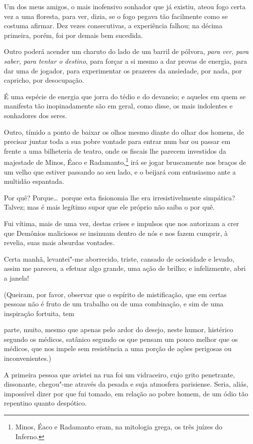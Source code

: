 Um dos meus amigos, o mais inofensivo sonhador que já existiu, ateou
fogo certa vez a uma floresta, para ver, dizia, se o fogo pegava tão facilmente como se costuma afirmar. Dez vezes consecutivas, a
experiência falhou; na décima primeira, porém, foi por demais bem
sucedida.

Outro poderá acender um charuto do lado de um barril de pólvora, \textit{para ver,
para saber, para tentar o destino}, para forçar a si mesmo a dar
provas de energia, para dar uma de jogador, para experimentar os prazeres da %
ansiedade, por nada, por capricho, por desocupação. 

É uma espécie de energia que jorra do tédio e do devaneio; e aqueles em quem se manifesta tão inopinadamente são em geral, como 
disse, os mais indolentes e sonhadores dos seres.

Outro, tímido a ponto de baixar os olhos mesmo diante do olhar dos
homens, de precisar juntar toda a sua pobre vontade
para entrar num bar ou passar em frente a uma bilheteria de teatro, onde
os fiscais lhe parecem investidos da majestade de Minos, Éaco e
Radamanto,\protect\footnote{  Minos, Éaco e Radamanto eram, na mitologia grega, os três juízes do
Inferno.} irá se jogar bruscamente nos braços de um
velho que estiver passando ao seu lado, e o beijará com entusiasmo
ante a multidão espantada.

Por quê? Porque\ldots\  porque esta fisionomia lhe era irresistivelmente
simpática? Talvez; mas é mais legítimo supor que ele próprio não saiba o
por quê.

Fui vítima, mais de uma vez, destas crises e impulsos que nos
autorizam a crer que Demônios maliciosos se insinuam dentro de nós e
nos fazem cumprir, à revelia, suas mais absurdas vontades.

Certa manhã, levantei"-me aborrecido, triste, cansado de ociosidade e
levado, assim me pareceu, a efetuar algo grande, uma ação de brilho; e infelizmente, abri a
janela!

(Queiram, por favor, observar que o espírito de mistificação, que em
certas pessoas não é fruto de um trabalho ou de uma combinação, e sim 
de uma inspiração fortuita, tem


\noindent{}parte, muito, mesmo que apenas pelo
ardor do desejo, neste humor, histérico segundo os médicos, satânico
segundo os que pensam um pouco melhor que os médicos, que nos
impele sem resistência a uma porção de ações perigosas ou
inconvenientes.)

A primeira pessoa que avistei na rua foi um vidraceiro, cujo grito
penetrante, dissonante, chegou"-me através da pesada e suja atmosfera
parisiense. Seria, aliás, impossível dizer por que fui tomado, em
relação ao pobre homem, de um ódio tão repentino quanto despótico.

